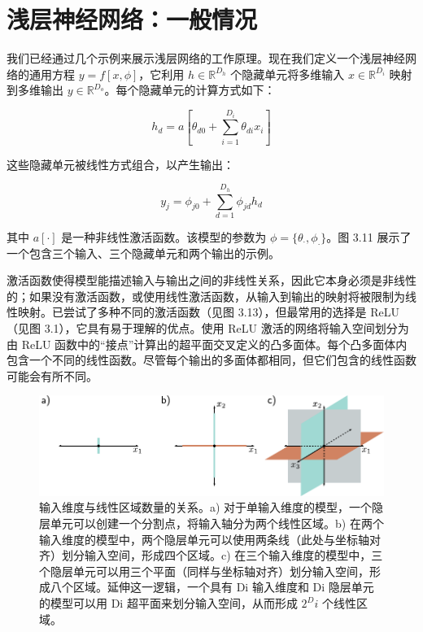 \documentclass[lang=cn,newtx,10pt,scheme=chinese]{elegantbook}
\begin{document}
\section{浅层神经网络：一般情况}

我们已经通过几个示例来展示浅层网络的工作原理。现在我们定义一个浅层神经网络的通用方程 \( y = f[x, \phi] \)，它利用 \( h \in \mathbb{R}^{D_h} \) 个隐藏单元将多维输入 \( x \in \mathbb{R}^{D_i} \) 映射到多维输出 \( y \in \mathbb{R}^{D_o} \)。每个隐藏单元的计算方式如下：

\begin{equation}
h_d = a \left[ \theta_{d0} + \sum_{i=1}^{D_i} \theta_{di}x_i \right] 
\end{equation}


这些隐藏单元被线性方式组合，以产生输出：

\begin{equation}
y_j = \phi_{j0} + \sum_{d=1}^{D_h} \phi_{jd}h_d 
\end{equation}

其中 \(a[\cdot]\)  是一种非线性激活函数。该模型的参数为 \(\phi = \{ \theta_{\cdot}, \phi_{\cdot}\}\)。图 3.11 展示了一个包含三个输入、三个隐藏单元和两个输出的示例。

激活函数使得模型能描述输入与输出之间的非线性关系，因此它本身必须是非线性的；如果没有激活函数，或使用线性激活函数，从输入到输出的映射将被限制为线性映射。已尝试了多种不同的激活函数（见图 3.13），但最常用的选择是 ReLU（见图 3.1），它具有易于理解的优点。使用 ReLU 激活的网络将输入空间划分为由 ReLU 函数中的“接点”计算出的超平面交叉定义的凸多面体。每个凸多面体内包含一个不同的线性函数。尽管每个输出的多面体都相同，但它们包含的线性函数可能会有所不同。

\begin{figure}[ht!]
	\centering
	\includegraphics[width=0.7\linewidth]{PDFFigures/UDLChap3PDF/ShallowHyperplanes.pdf}
\caption{输入维度与线性区域数量的关系。a) 对于单输入维度的模型，一个隐层单元可以创建一个分割点，将输入轴分为两个线性区域。b) 在两个输入维度的模型中，两个隐层单元可以使用两条线（此处与坐标轴对齐）划分输入空间，形成四个区域。c) 在三个输入维度的模型中，三个隐层单元可以用三个平面（同样与坐标轴对齐）划分输入空间，形成八个区域。延伸这一逻辑，一个具有 Di 输入维度和 Di 隐层单元的模型可以用 Di 超平面来划分输入空间，从而形成 $2^Di$ 个线性区域。}
\end{figure}
\end{document}
